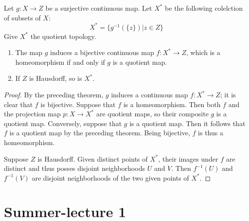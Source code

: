 \documentclass[12pt, a4paper, oneside, openright, titlepage]{book}
\begin{document}
\begin{corollary}
    Let $g:X\rightarrow Z$ be a surjective continuous map. Let $X^*$ be the following colelction of subsets of $X$: \begin{equation*}
        X^* = \{g^{-1}(\{z\})\vert z \in Z\}
    \end{equation*}
    Give $X^*$ the quotient topology. \begin{enumerate}
        \item The map $g$ induces a bijective continuous map $f:X^*\rightarrow Z$, which is a homeomorphism if and only if $g$ is a quotient map.
            \begin{center}
            \end{center}
            \item If $Z$ is Hausdorff, so is $X^*$.
    \end{enumerate}
\end{corollary}
\begin{proof}
    By the preceding theorem, $g$ induces a continuous map $f:X^*\rightarrow Z$; it is clear that $f$ is bijective. Suppose that $f$ is a homeomorphism. Then both $f$ and the projection map $p:X\rightarrow X^*$ are quotient maps, so their composite $g$ is a quotient map. Conversely, suppose that $g$ is a quotient map. Then it follows that $f$ is a quotient map by the preceding theorem. Being bijective, $f$ is thus a homeomorphism.

    Suppose $Z$ is Hausdorff. Given distinct points of $X^*$, their images under $f$ are distinct and thus posses disjoint neighborhoods $U$ and $V$. Then $f^{-1}(U)$ and $f^{-1}(V)$ are disjoint neighborhoods of the two given points of $X^*$.
\end{proof}




\section{Summer-lecture 1}
\end{document}
